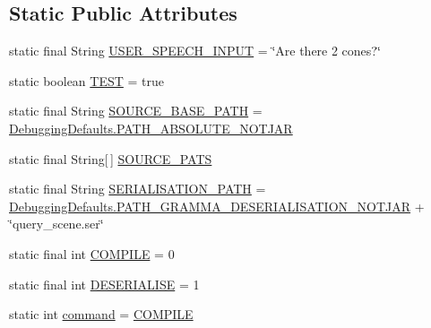 \subsection*{Static Public Attributes}
\begin{DoxyCompactItemize}
\item 
static final String \hyperlink{classit_1_1emarolab_1_1cagg_1_1example_1_1APIusage_ab19ca73626b1011aa6904a30f866f470}{U\-S\-E\-R\-\_\-\-S\-P\-E\-E\-C\-H\-\_\-\-I\-N\-P\-U\-T} = \char`\"{}Are there 2 cones?\char`\"{}
\item 
static boolean \hyperlink{classit_1_1emarolab_1_1cagg_1_1example_1_1APIusage_a5500e480649825534245eec8760bbf32}{T\-E\-S\-T} = true
\item 
static final String \hyperlink{classit_1_1emarolab_1_1cagg_1_1example_1_1APIusage_a1c83f94c518dcd58ae612a1ba64b544e}{S\-O\-U\-R\-C\-E\-\_\-\-B\-A\-S\-E\-\_\-\-P\-A\-T\-H} = \hyperlink{classit_1_1emarolab_1_1cagg_1_1debugging_1_1DebuggingDefaults_ab6020d09c49f55a681ceb6a14c47e4d3}{Debugging\-Defaults.\-P\-A\-T\-H\-\_\-\-A\-B\-S\-O\-L\-U\-T\-E\-\_\-\-N\-O\-T\-J\-A\-R}
\item 
static final String\mbox{[}$\,$\mbox{]} \hyperlink{classit_1_1emarolab_1_1cagg_1_1example_1_1APIusage_a887e583ea89494215f7054a8b52692ca}{S\-O\-U\-R\-C\-E\-\_\-\-P\-A\-T\-S}
\item 
static final String \hyperlink{classit_1_1emarolab_1_1cagg_1_1example_1_1APIusage_a423346e2a1caa970343f21c131351927}{S\-E\-R\-I\-A\-L\-I\-S\-A\-T\-I\-O\-N\-\_\-\-P\-A\-T\-H} = \hyperlink{classit_1_1emarolab_1_1cagg_1_1debugging_1_1DebuggingDefaults_a8cf820f63cd9d9288cea388c2b44e585}{Debugging\-Defaults.\-P\-A\-T\-H\-\_\-\-G\-R\-A\-M\-M\-A\-\_\-\-D\-E\-S\-E\-R\-I\-A\-L\-I\-S\-A\-T\-I\-O\-N\-\_\-\-N\-O\-T\-J\-A\-R} + \char`\"{}query\-\_\-scene.\-ser\char`\"{}
\item 
static final int \hyperlink{classit_1_1emarolab_1_1cagg_1_1example_1_1APIusage_a71d4b6e26297065605624b302b0ab173}{C\-O\-M\-P\-I\-L\-E} = 0
\item 
static final int \hyperlink{classit_1_1emarolab_1_1cagg_1_1example_1_1APIusage_af308dfbdcb747bc10039350250e04163}{D\-E\-S\-E\-R\-I\-A\-L\-I\-S\-E} = 1
\item 
static int \hyperlink{classit_1_1emarolab_1_1cagg_1_1example_1_1APIusage_abae8cc4ce00dc484e44a0cc67f367485}{command} = \hyperlink{classit_1_1emarolab_1_1cagg_1_1example_1_1APIusage_a71d4b6e26297065605624b302b0ab173}{C\-O\-M\-P\-I\-L\-E}
\end{DoxyCompactItemize}
